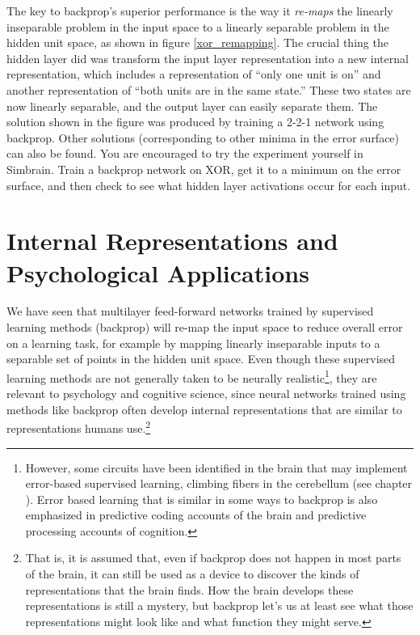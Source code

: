 The key to backprop's superior performance is the way it \emph{re-maps} the linearly inseparable problem in the input space to a linearly separable problem in the hidden unit space, as shown in figure \ref{xor_remapping}. The crucial thing the hidden layer did was transform the input layer representation into a new internal representation, which includes a representation of ``only one unit is on'' and another representation of ``both units are in the same state.''  These two states are now linearly separable, and the output layer can easily separate them. The solution shown in the figure was produced by training a 2-2-1 network using backprop. Other solutions (corresponding to other minima in the error surface) can also be found. You are encouraged to try the experiment yourself in Simbrain. Train a backprop network on XOR, get it to a minimum on the error surface, and then check to see what hidden layer activations occur for each input.

\section{Internal Representations and Psychological Applications}\label{internalRepsFF}


We have seen that multilayer feed-forward networks trained by supervised learning methods (\eg backprop) will re-map the input space to reduce overall error on a learning task, for example by mapping linearly inseparable inputs to a separable set of points in the hidden unit space. Even though these supervised learning methods are not generally taken to be neurally realistic\footnote{However, some circuits have been identified in the brain that may implement error-based supervised learning, \eg climbing fibers in the cerebellum (see chapter ). Error based learning that is similar in some ways to backprop is also emphasized in predictive coding accounts of the brain and predictive processing accounts of cognition.}, they are relevant to psychology and cognitive science, since neural networks trained using methods like backprop often develop internal representations that are similar to representations humans use.\footnote{That is, it is assumed that, even if backprop does not happen in most parts of the brain, it can still be used as a device to discover the kinds of representations that the brain finds. How the brain develops these representations is still a mystery, but backprop let's us at least see what those representations might look like and what function they might serve.}

